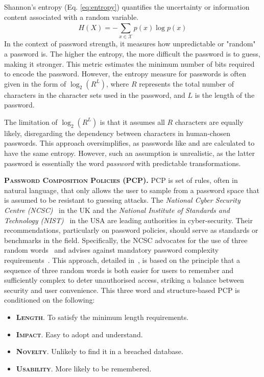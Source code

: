 Shannon's entropy (Eq. \ref{eq:entropy}) quantifies the uncertainty or information content associated with a random variable. \begin{equation}\label{eq:entropy}
H(X) = -\sum_{x\in\mathcal{X}}^{} p(x) \log p(x)
\end{equation} In the context of password strength, it measures how unpredictable or "random" a password is. The higher the entropy, the more difficult the password is to guess, making it stronger. This metric estimates the minimum number of bits required to encode the password. However, the entropy measure for passwords is often given in the form of $\log_2(R^L)$, where $R$ represents the total number of characters in the character sets used in the password, and $L$ is the length of the password.

The limitation of $\log_2(R^L)$ is that it assumes all $R$ characters are equally likely, disregarding the dependency between characters in human-chosen passwords. This approach oversimplifies, as passwords like  and  are calculated to have the same entropy. However, such an assumption is unrealistic, as the latter password is essentially the word \textit{password} with predictable transformations.

\textbf{\textsc{Password Composition Policies (PCP).}}\: PCP is set of rules, often in natural language, that only allows the user to sample from a password space that is assumed to be resistant to guessing attacks. The \textit{National Cyber Security Centre (NCSC)}~\cite{ncsc2024} in the UK and the \textit{National Institute of Standards and Technology (NIST)}~\cite{nist2024} in the USA are leading authorities in cyber-security. Their recommendations, particularly on password policies, should serve as standards or benchmarks in the field. Specifically, the NCSC advocates for the use of three random words~\cite{McCormackthreerandom} and advises against mandatory password complexity requirements~\cite{password_policy_ncsc}. This approach, detailed in~\cite{Kate_2021}, is based on the principle that a sequence of three random words is both easier for users to remember and sufficiently complex to deter unauthorised access, striking a balance between security and user convenience. This three word and structure-based PCP is conditioned on the following:

\begin{itemize}[itemsep=0pt, parsep=0pt, leftmargin=11pt]
    \item \textsc{\textbf{Length}}. To satisfy the minimum length requirements.
    \item \textsc{\textbf{Impact}}. Easy to adopt and understand.
    \item \textsc{\textbf{Novelty}}. Unlikely to find it in a breached database.
    \item \textsc{\textbf{Usability}}. More likely to be remembered.
\end{itemize}
\label{jmp::chp4::ncsc-pcp}

